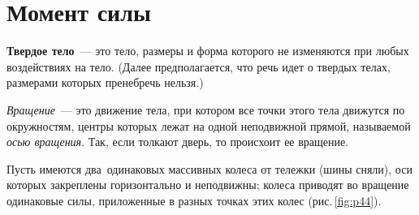 \documentclass[main.tex]{subfiles}
\begin{document}



 

 

 
   

\section{Момент силы}

\textbf{Твердое тело}~--- это тело, размеры и форма которого не изменяются при любых воздействиях на тело. (Далее предполагается, что речь идет о твердых телах, размерами которых пренебречь нельзя.)

\emph{Вращение}~--- это движение тела, при котором все точки этого тела движутся по окружностям, центры которых лежат на одной неподвижной прямой, называемой \emph{осью вращения}. Так, если толкают дверь, то происхоит ее вращение.

Пусть имеются два~одинаковых массивных колеса от тележки (шины сняли), оси которых закреплены горизонтально и неподвижны; колеса приводят во вращение одинаковые силы, приложенные в разных точках этих колес (рис.\,\ref{fig:p44}).






\end{document}
